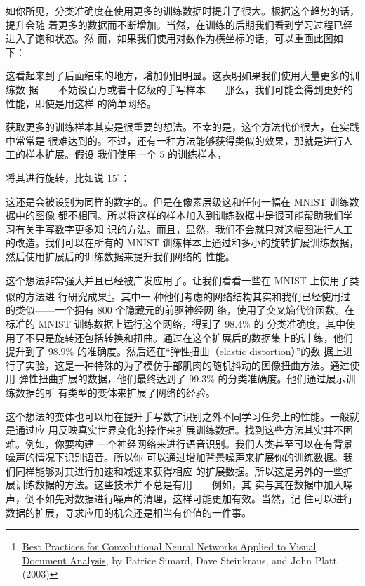 如你所见，分类准确度在使用更多的训练数据时提升了很大。根据这个趋势的话，提升会随
着更多的数据而不断增加。当然，在训练的后期我们看到学习过程已经进入了饱和状态。然
而，如果我们使用对数作为横坐标的话，可以重画此图如下：

这看起来到了后面结束的地方，增加仍旧明显。这表明如果我们使用大量更多的训练数
据——不妨设百万或者十亿级的手写样本——那么，我们可能会得到更好的性能，即使是用这样
的简单网络。

获取更多的训练样本其实是很重要的想法。不幸的是，这个方法代价很大，在实践中常常是
很难达到的。不过，还有一种方法能够获得类似的效果，那就是进行人工的样本扩展。假设
我们使用一个 $5$ 的训练样本，

将其进行旋转，比如说 $15^{\circ}$：

这还是会被设别为同样的数字的。但是在像素层级这和任何一幅在 MNIST 训练数据中的图像
都不相同。所以将这样的样本加入到训练数据中是很可能帮助我们学习有关手写数字更多知
识的方法。而且，显然，我们不会就只对这幅图进行人工的改造。我们可以在所有的 MNIST
训练样本上通过和多小的旋转扩展训练数据，然后使用扩展后的训练数据来提升我们网络的
性能。

这个想法非常强大并且已经被广发应用了。让我们看看一些在 MNIST 上使用了类似的方法进
行研究成果\footnote{\href{http://dx.doi.org/10.1109/ICDAR.2003.1227801}{Best
    Practices for Convolutional Neural Networks Applied to Visual Document
    Analysis}, by Patrice Simard, Dave Steinkraus, and John Platt (2003)}。其中一
种他们考虑的网络结构其实和我们已经使用过的类似——一个拥有 800 个隐藏元的前驱神经网
络，使用了交叉熵代价函数。在标准的 MNIST 训练数据上运行这个网络，得到了 98.4\% 的
分类准确度，其中使用了不只是旋转还包括转换和扭曲。通过在这个扩展后的数据集上的训
练，他们提升到了 98.9\% 的准确度。然后还在“弹性扭曲（elastic distortion）”的数
据上进行了实验，这是一种特殊的为了模仿手部肌肉的随机抖动的图像扭曲方法。通过使用
弹性扭曲扩展的数据，他们最终达到了 99.3\% 的分类准确度。他们通过展示训练数据的所
有类型的变体来扩展了网络的经验。

这个想法的变体也可以用在提升手写数字识别之外不同学习任务上的性能。一般就是通过应
用反映真实世界变化的操作来扩展训练数据。找到这些方法其实并不困难。例如，你要构建
一个神经网络来进行语音识别。我们人类甚至可以在有背景噪声的情况下识别语音。所以你
可以通过增加背景噪声来扩展你的训练数据。我们同样能够对其进行加速和减速来获得相应
的扩展数据。所以这是另外的一些扩展训练数据的方法。这些技术并不总是有用——例如，其
实与其在数据中加入噪声，倒不如先对数据进行噪声的清理，这样可能更加有效。当然，记
住可以进行数据的扩展，寻求应用的机会还是相当有价值的一件事。

